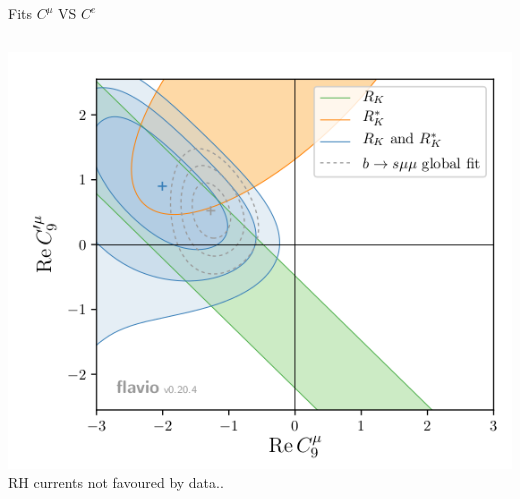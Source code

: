 \documentclass[9pt,usenames,dvipsnames]{beamer}
\begin{document}
\begin{frame}{Fits $ C^\mu$  VS $C^e$ }
\begin{columns}[c]
\begin{center}
			\includegraphics[width= \textwidth]{./assets/c9_c9p} \\ RH currents not favoured by data.. 
		\end{center}	
	\end{columns}
\end{frame}
\end{document}
